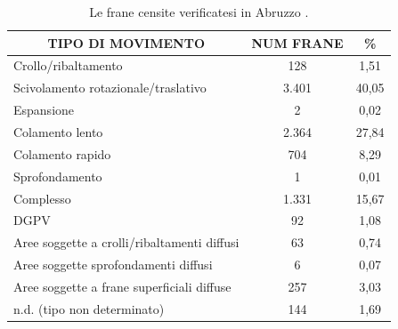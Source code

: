 \begin{table}[h]
	\centering
	\begin{tabular}{|l|c|c|}
		\hline
		\multicolumn{1}{|c|}{\cellcolor{gray!50} \textbf{TIPO DI MOVIMENTO}} & {\cellcolor{gray!50}\textbf{NUM FRANE}} & {\cellcolor{gray!50} \textbf{\%}} \\ \hline
		Crollo/ribaltamento & 128  & 1,51   \\ \hline
		Scivolamento rotazionale/traslativo  & 3.401  & 40,05                              \\ \hline
		Espansione                                                                                      & 2                                        & 0,02                               \\ \hline
		Colamento lento                                                                                 & 2.364                                    & 27,84                              \\ \hline
		Colamento rapido                                                                                & 704                                      & 8,29                               \\ \hline
		Sprofondamento                                                                                  & 1                                        & 0,01                               \\ \hline
		Complesso                                                                                       & 1.331                                    & 15,67                              \\ \hline
		DGPV                                                                                            & 92                                       & 1,08                               \\ \hline
		Aree soggette a crolli/ribaltamenti diffusi                                                     & 63                                       & 0,74                               \\ \hline
		Aree soggette sprofondamenti diffusi                                                            & 6                                        & 0,07                               \\ \hline
		Aree soggette a frane superficiali diffuse                                                      & 257                                      & 3,03                               \\ \hline
		n.d. (tipo non determinato)                                                                     & 144                                      & 1,69                               \\ \hline
	\end{tabular}
	\caption{Le frane censite verificatesi in Abruzzo 	\cite{d200718}.}
	\label{tab:riassunto_frane}
\end{table}


